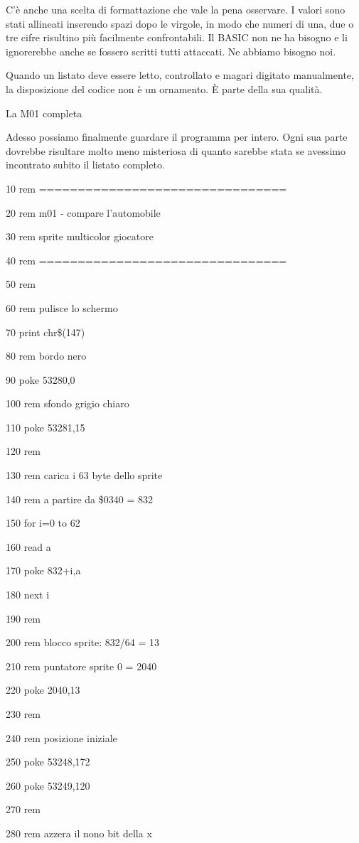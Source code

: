 \documentclass{article}
\begin{document}
C'è anche una scelta di formattazione che vale la pena osservare. I valori sono stati allineati inserendo spazi dopo le
virgole, in modo che numeri di una, due o tre cifre risultino più facilmente confrontabili. Il BASIC non ne ha bisogno
e li ignorerebbe anche se fossero scritti tutti attaccati. Ne abbiamo bisogno noi.

Quando un listato deve essere letto, controllato e magari digitato manualmente, la disposizione del codice non è un
ornamento. È parte della sua qualità.

La M01 completa

Adesso possiamo finalmente guardare il programma per intero. Ogni sua parte dovrebbe risultare molto meno misteriosa di
quanto sarebbe stata se avessimo incontrato subito il listato completo.

10 rem ================================

20 rem m01 - compare l'automobile

30 rem sprite multicolor giocatore

40 rem ================================

50 rem

60 rem pulisce lo schermo

70 print chr\$(147)

80 rem bordo nero

90 poke 53280,0

100 rem sfondo grigio chiaro

110 poke 53281,15

120 rem

130 rem carica i 63 byte dello sprite

140 rem a partire da \$0340 = 832

150 for i=0 to 62

160 read a

170 poke 832+i,a

180 next i

190 rem

200 rem blocco sprite: 832/64 = 13

210 rem puntatore sprite 0 = 2040

220 poke 2040,13

230 rem

240 rem posizione iniziale

250 poke 53248,172

260 poke 53249,120

270 rem

280 rem azzera il nono bit della x
\end{document}
